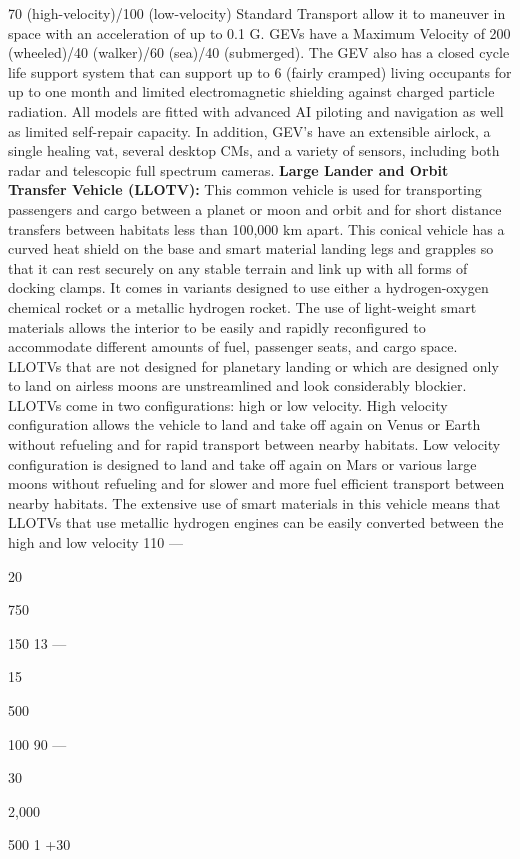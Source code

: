 70 (high-velocity)/100 (low-velocity) 
Standard Transport
allow it to maneuver in space with an acceleration of 
up to 0.1 G. GEVs have a Maximum Velocity of 200 
(wheeled)/40 (walker)/60 (sea)/40 (submerged).
The GEV also has a closed cycle life support system 
that can support up to 6 (fairly cramped) living 
occupants for up to one month and limited electromagnetic
shielding against charged particle radiation.
All models are fitted with advanced AI piloting and 
navigation as well as limited self-repair capacity. In 
addition, GEV's have an extensible airlock, a single 
healing vat, several desktop CMs, and a variety of 
sensors, including both radar and telescopic full spectrum
cameras.
\textbf{Large Lander and Orbit Transfer Vehicle (LLOTV):}
This common vehicle is used for transporting passengers
and cargo between a planet or moon and orbit
and for short distance transfers between habitats 
less than 100,000 km apart. This conical vehicle has 
a curved heat shield on the base and smart material 
landing legs and grapples so that it can rest securely 
on any stable terrain and link up with all forms of 
docking clamps. It comes in variants designed to use 
either a hydrogen-oxygen chemical rocket or a metallic
hydrogen rocket. The use of light-weight smart
materials allows the interior to be easily and rapidly 
reconfigured to accommodate different amounts of 
fuel, passenger seats, and cargo space. LLOTVs that 
are not designed for planetary landing or which are 
designed only to land on airless moons are unstreamlined
and look considerably blockier.
LLOTVs come in two configurations: high or low 
velocity. High velocity configuration allows the vehicle 
to land and take off again on Venus or Earth without 
refueling and for rapid transport between nearby 
habitats. Low velocity configuration is designed to 
land and take off again on Mars or various large 
moons without refueling and for slower and more 
fuel efficient transport between nearby habitats. The 
extensive use of smart materials in this vehicle means 
that LLOTVs that use metallic hydrogen engines can 
be easily converted between the high and low velocity 
110
—

20

750

150
13
—

15

500

100
90
—

30

2,000

500
1
+30

